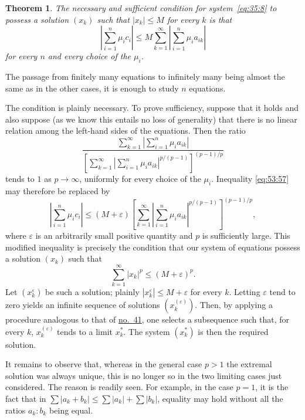 \documentclass[
  paper=b5,
  fontsize=13pt,
  twoside=true,
  open=any,
  bookmarkpackage=false,
  chapterprefix=true,
  headings=normal
]{scrbook}
\newtheorem*{theorem}{Theorem}
\theoremstyle{definition}
\begin{document}
\begin{theorem}
The necessary and sufficient condition for system~\eqref{eq:35:8} to possess a
solution $(x_k)$ such that $|x_k|\leq M$ for every $k$ is that
\begin{equation}
  \left|\sum_{i=1}^{n}\mu_i c_i\right|
  \leq M\sum_{k=1}^{\infty}
    \left|\sum_{i=1}^{n}\mu_i a_{ik}\right|
  \tag{57}\label{eq:53:57}
\end{equation}
for every $n$ and every choice of the $\mu_i$.
\end{theorem}

The passage from finitely many equations to infinitely many being almost
the same as in the other cases, it is enough to study $n$ equations.

The condition is plainly necessary. To prove sufficiency, suppose that it
holds and also suppose (as we know this entails no loss of generality) that
there is no linear relation among the left-hand sides of the equations.
Then the ratio
\[
 \frac{
  \displaystyle\sum_{k=1}^{\infty}
    \left|\sum_{i=1}^{n}\mu_i a_{ik}\right|}
 {\displaystyle\left[
  \sum_{k=1}^{\infty}
    \left|\sum_{i=1}^{n}\mu_i a_{ik}\right|^{p/(p-1)}
 \right]^{(p-1)/p}}
\]
tends to $1$ as $p\to\infty$, uniformly for every choice of the $\mu_i$.
Inequality \eqref{eq:53:57} may therefore be replaced by
\[
 \left|\sum_{i=1}^{n}\mu_i c_i\right|
 \leq (M+\varepsilon)\left[
  \sum_{k=1}^{\infty}
    \left|\sum_{i=1}^{n}\mu_i a_{ik}\right|^{p/(p-1)}
 \right]^{(p-1)/p},
\]
where $\varepsilon$ is an arbitrarily small positive quantity and $p$ is
sufficiently large. This modified inequality is precisely the condition
that our system of equations possess a solution $(x_k)$ such that
\[
  \sum_{k=1}^{\infty}|x_k|^p\leq(M+\varepsilon)^p.
\]
Let $(x_k^{\varepsilon})$ be such a solution; plainly
$|x_k^{\varepsilon}|\leq M+\varepsilon$ for every $k$. Letting
$\varepsilon$ tend to zero yields an infinite sequence of solutions
$(x_k^{(\varepsilon)})$. Then, by applying a procedure analogous to that of
\hyperref[sec:41]{no.~41}, one selects a subsequence such that, for every
$k$, $x_k^{(\varepsilon)}$ tends to a limit $x_k^*$. The system $(x_k^*)$
is then the required solution.

It remains to observe that, whereas in the general case $p>1$ the extremal
solution was always unique, this is no longer so in the two limiting cases
just considered. The reason is readily seen. For example, in the case
$p=1$, it is the fact that in
$\sum|a_k+b_k|\leq\sum|a_k|+\sum|b_k|$, equality may hold without all the
ratios $a_k:b_k$ being equal.
\end{document}
